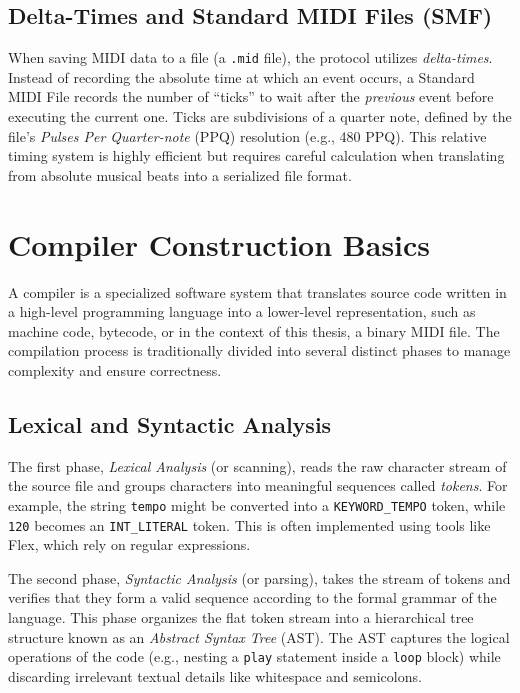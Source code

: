 \subsection{Delta-Times and Standard MIDI Files (SMF)}\label{detail-subsec:delta-times-and-standard-midi-files-(smf)}

When saving MIDI data to a file (a \texttt{.mid} file), the protocol utilizes \textit{delta-times}.
Instead of recording the absolute time at which an event occurs, a Standard MIDI File records the number of ``ticks'' to
wait after the \textit{previous} event before executing the current one.
Ticks are subdivisions of a quarter note, defined by the file's \textit{Pulses Per Quarter-note} (PPQ) resolution (e.g.,
480 PPQ).
This relative timing system is highly efficient but requires careful calculation when translating from absolute musical
beats into a serialized file format.


\section{Compiler Construction Basics}\label{detail-sec:background-compilers}

A compiler is a specialized software system that translates source code written in a high-level programming language
into a lower-level representation, such as machine code, bytecode, or in the context of this thesis, a binary MIDI file.
The compilation process is traditionally divided into several distinct phases to manage complexity and ensure
correctness.

\subsection{Lexical and Syntactic Analysis}\label{detail-subsec:lexical-and-syntactic-analysis}

The first phase, \textit{Lexical Analysis} (or scanning), reads the raw character stream of the source file and groups
characters into meaningful sequences called \textit{tokens}.
For example, the string \texttt{tempo} might be converted into a \texttt{KEYWORD\_TEMPO} token, while \texttt{120}
becomes an \texttt{INT\_LITERAL} token.
This is often implemented using tools like Flex, which rely on regular expressions.

The second phase, \textit{Syntactic Analysis} (or parsing), takes the stream of tokens and verifies that they form a
valid sequence according to the formal grammar of the language.
This phase organizes the flat token stream into a hierarchical tree structure known as an \textit{Abstract Syntax Tree}
(AST).
The AST captures the logical operations of the code (e.g., nesting a \texttt{play} statement inside a \texttt{loop}
block) while discarding irrelevant textual details like whitespace and semicolons.

